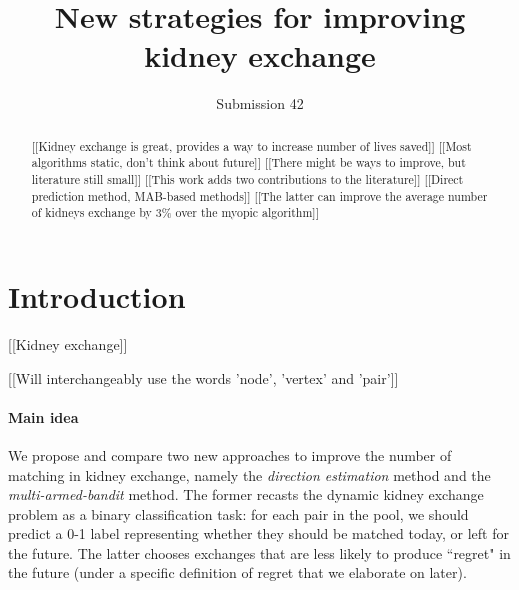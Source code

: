 \documentclass[format=acmsmall, review=false]{acmart}
\begin{document}
\title[New strategies for improving kidney exchange]{New strategies for improving kidney exchange}  
\author{Submission 42}

\begin{abstract}
[[Kidney exchange is great, provides a way to increase number of lives saved]] [[Most algorithms static, don't think about future]] [[There might be ways to improve, but literature still small]] [[This work adds two contributions to the literature]] [[Direct prediction method, MAB-based methods]] [[The latter can improve the average number of kidneys exchange by 3\% over the myopic algorithm]]
\end{abstract}



\maketitle

\section{Introduction}

[[Kidney exchange]]

[[Will interchangeably use the words 'node', 'vertex' and 'pair']]

\paragraph{\textbf{Main idea}} We propose and compare two new approaches to improve the number of matching in kidney exchange, namely the \emph{direction estimation} method and the \emph{multi-armed-bandit} method. The former recasts the dynamic kidney exchange problem as a binary classification task: for each pair in the pool, we should predict a 0-1 label representing whether they should be matched today, or left for the future. The latter chooses exchanges that are less likely to produce ``regret" in the future (under a specific definition of regret that we elaborate on later).
\end{document}
